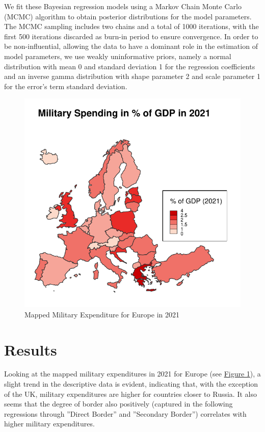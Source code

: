 \documentclass[12pt,a4paper]{article}
\begin{document}
We fit these Bayesian regression models using a Markov Chain Monte Carlo (MCMC) algorithm to obtain posterior distributions for the model parameters. The MCMC sampling includes two chains and a total of 1000 iterations, with the first 500 iterations discarded as burn-in period to ensure convergence. In order to be non-influential, allowing the data to have a dominant role in the estimation of model parameters, we use weakly uninformative priors, namely a normal distribution with mean 0 and standard deviation 1 for the regression coefficients and an inverse gamma distribution with shape parameter 2 and scale parameter 1 for the error's term standard deviation.
\begin{figure}[h]
\center
\label{F:1}
\includegraphics[scale=0.75]{Map1.pdf}
\caption{Mapped Military Expenditure for Europe in 2021}
\end{figure}
\section{Results}
Looking at the mapped military expenditures in 2021 for Europe (see \hyperref[F:1]{\color{blue}Figure 1}), a slight trend in the descriptive data is evident, indicating that, with the exception of the UK, military expenditures are higher for countries closer to Russia. It also seems that the degree of border also positively (captured in the following regressions through ''Direct Border'' and ''Secondary Border'') correlates with higher military expenditures. 
\end{document}
